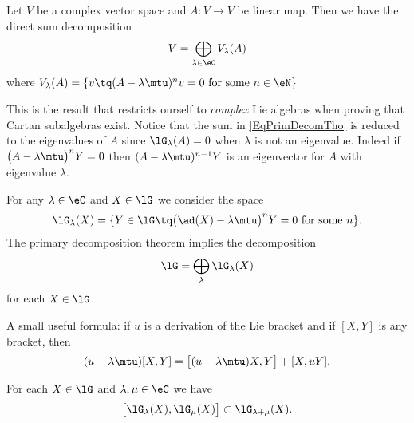 \begin{lemma}
    Let \( V\) be a complex vector space and \( A\colon V\to V\) be linear map. Then we have the direct sum decomposition
    \begin{equation}        \label{EqPrimDecomTho}
        V=\bigoplus_{\lambda\in\eC}V_{\lambda}(A)
    \end{equation}
    where \( V_{\lambda}(A)=\{ v\tq (A-\lambda\mtu)^nv=0\text{ for some } n\in\eN \} \)
\end{lemma}
This is the result that restricts ourself to \emph{complex} Lie algebras when proving that Cartan subalgebras exist. Notice that the sum in \eqref{EqPrimDecomTho} is reduced to the eigenvalues of \( A\) since \( \lG_{\lambda}(A)=0\) when \( \lambda\) is not an eigenvalue. Indeed if \( \big( A-\lambda\mtu \big)^nY=0\) then \( (A-\lambda\mtu)^{n-1}Y\) is an eigenvector for \( A\) with eigenvalue \( \lambda\).

For any \( \lambda\in\eC\) and \( X\in\lG\) we consider the space
\begin{equation}
    \lG_{\lambda}(X)=\{ Y\in\lG\tq \big( \ad(X)-\lambda\mtu \big)^nY=0\text{ for some } n \}.
\end{equation}
The primary decomposition theorem implies the decomposition
\begin{equation}        \label{EqDecomplGpRimDecombijk}
    \lG=\bigoplus_{\lambda}\lG_{\lambda}(X)
\end{equation}
for each \( X\in\lG\).

A small useful formula: if \( u\) is a derivation of the Lie bracket and if \( [X,Y]\) is any bracket, then
\begin{equation}\label{EqWGujmeF}
    (u-\lambda\mtu)[X,Y]=\big[ (u-\lambda\mtu)X,Y \big]+[X,uY].
\end{equation}

\begin{lemma}   \label{LemVZzSnUW}
    For each \( X\in\lG\) and \( \lambda,\mu\in\eC\) we have
    \begin{equation}
        \big[ \lG_{\lambda}(X),\lG_{\mu}(X) \big]\subset\lG_{\lambda+\mu}(X).
    \end{equation}
\end{lemma}


